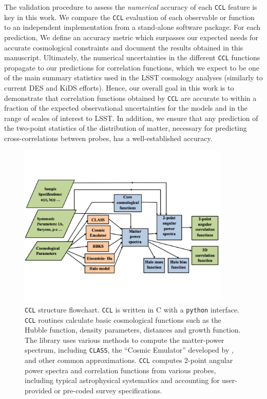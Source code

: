 \documentclass[\docopts]{\docclass}
\newcommand{\ccl}{{\tt CCL}\xspace}
\newcommand{\class}{{\tt CLASS}\xspace}
\begin{document}
The validation procedure to assess the {\it numerical} accuracy of each \ccl feature is key in this work. We compare the \ccl evaluation of each observable or function to an independent implementation from a stand-alone software package. For each prediction, We define an accuracy metric which surpasses our expected needs for accurate cosmological constraints and document the results obtained in this manuscript. Ultimately, the numerical uncertainties in the different \ccl functions propagate to our predictions for correlation functions, which we expect to be one of the main summary statistics used in the LSST cosmology analyses (similarly to current DES and KiDS efforts). Hence, our overall goal in this work is to demonstrate that correlation functions obtained by \ccl are accurate to within a fraction of the expected observational uncertainties for the models and in the range of scales of interest to LSST. In addition, we ensure that any prediction of the two-point statistics of the distribution of matter, necessary for predicting cross-correlations between probes, has a well-established accuracy.

\begin{figure}
\centering
\includegraphics[width=0.9\textwidth]{CCL_Flowchart5}
\caption{\ccl structure flowchart. \ccl is written in C with a {\tt python} interface. \ccl routines calculate basic cosmological functions such as the Hubble function, density parameters, distances and growth function. The library uses various methods to compute the matter-power spectrum, including \class, the ``Cosmic Emulator'' developed by \citet{Lawrence17}, and other common approximations. \ccl computes 2-point angular power spectra and correlation functions from various probes, including typical astrophysical systematics and accounting for user-provided or pre-coded survey specifications.}
\label{fig:CCL_structure}
\end{figure}
\end{document}
